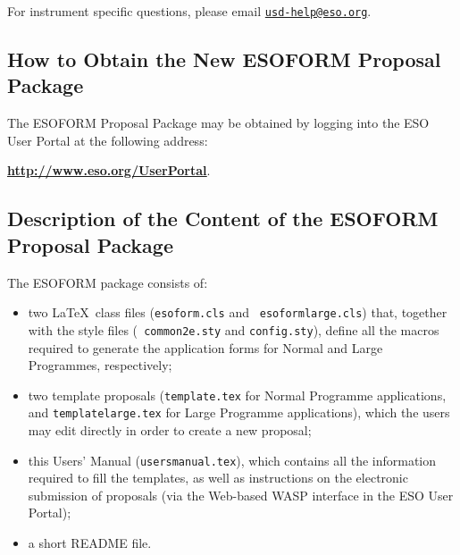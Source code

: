 \documentclass{article}
\begin{document}
For instrument specific questions,
please email \href{mailto:usd-help@eso.org}{\tt usd-help@eso.org}.


\subsection{How to Obtain the {\bf New ESOFORM} Proposal Package}

The ESOFORM Proposal Package may be obtained by logging into the ESO
User Portal at the following address:

\begin{center}
  \href{http://www.eso.org/UserPortal}{\bf
    \underline{http://www.eso.org/UserPortal}}. 
\end{center}


\subsection{Description of the Content of the ESOFORM Proposal
  Package}

\noindent The ESOFORM package consists of:
\begin{itemize}  
\item two \LaTeX\ class files ({\tt esoform.cls} and {\tt
    esoformlarge.cls}) that, together with the style files \linebreak ({\tt
    common2e.sty} and {\tt config.sty}), define
    all the macros required to generate the application forms for
    Normal and Large Programmes, respectively;
\item two template proposals ({\tt  template.tex} for Normal
    Programme applications, and  {\tt templatelarge.tex}  for  Large  Programme 
    applications), which the  users   may  edit directly in  order  to 
    create a new proposal;
\item this Users' Manual ({\tt usersmanual.tex}), which contains all the 
    information  required to fill the templates, as well as
    instructions on the electronic submission of proposals (via the
    Web-based WASP interface in the ESO User Portal);

\item a short README file.
\end{itemize} 

\end{document}
